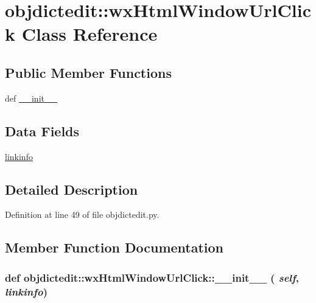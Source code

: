\hypertarget{classobjdictedit_1_1wxHtmlWindowUrlClick}{
\section{objdictedit::wx\-Html\-Window\-Url\-Click Class Reference}
\label{classobjdictedit_1_1wxHtmlWindowUrlClick}
}
\subsection*{Public Member Functions}
\begin{CompactItemize}
\item 
def \hyperlink{classobjdictedit_1_1wxHtmlWindowUrlClick_a045fe12f2047ab57620eeaaaa2f211e}{\_\-\_\-init\_\-\_\-}
\end{CompactItemize}
\subsection*{Data Fields}
\begin{CompactItemize}
\item 
\hyperlink{classobjdictedit_1_1wxHtmlWindowUrlClick_6a78aa98e9dcf8a31aa79b429998cf46}{linkinfo}
\end{CompactItemize}


\subsection{Detailed Description}




Definition at line 49 of file objdictedit.py.

\subsection{Member Function Documentation}
\hypertarget{classobjdictedit_1_1wxHtmlWindowUrlClick_a045fe12f2047ab57620eeaaaa2f211e}{
\subsubsection[\_\-\_\-init\_\-\_\-]{\setlength{\rightskip}{0pt plus 5cm}def objdictedit::wx\-Html\-Window\-Url\-Click::\_\-\_\-init\_\-\_\- ( {\em self},  {\em linkinfo})}}
\label{classobjdictedit_1_1wxHtmlWindowUrlClick_a045fe12f2047ab57620eeaaaa2f211e}




